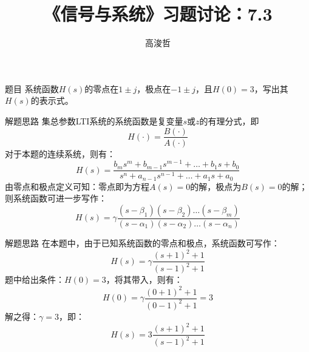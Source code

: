 \documentclass[UTF8]{ctexbeamer}
\title{《信号与系统》习题讨论：7.3}
\author{高浚哲}
\begin{document}
  
  \begin{frame}
    \maketitle
  \end{frame}

  \begin{frame}{题目}
    系统函数$H(s)$的零点在$1\pm j$，极点在$-1\pm j$，且$H(0)=3$，写出其$H(s)$的表示式。
  \end{frame}

  \begin{frame}{解题思路}
    集总参数LTI系统的系统函数是复变量$s$或$z$的有理分式，即
    $$
      H(\cdot) = \frac{B(\cdot)}{A(\cdot)}
    $$
    对于本题的连续系统，则有：
    $$
      H(s)=\frac{b_m s^m+b_{m-1} s^{m-1}+\dots+b_1 s + b_0}{s^n+a_{n-1}s^{n-1}+\dots+a_1s+a_0}
    $$
    由零点和极点定义可知：零点即为方程$A(s)=0$的解，极点为$B(s)=0$的解；则系统函数可进一步写作：
    $$
      H(s)=\gamma \frac{(s-\beta_1)(s-\beta_2)\dots(s-\beta_m)}{(s-\alpha_1)(s-\alpha_2)\dots(s-\alpha_n)}
    $$
  \end{frame}

  \begin{frame}{解题思路}
    在本题中，由于已知系统函数的零点和极点，系统函数可写作：
    $$
      H(s)=\gamma \frac{(s+1)^2+1}{(s-1)^2+1}
    $$
    题中给出条件：$H(0)=3$，将其带入，则有：
    $$
      H(0)=\gamma \frac{(0 + 1)^2+1}{(0-1)^2+1}=3
    $$
    解之得：$\gamma = 3$，即：
    $$
      H(s)=3 \frac{(s+1)^2+1}{(s-1)^2+1}
    $$
  \end{frame}
\end{document}
